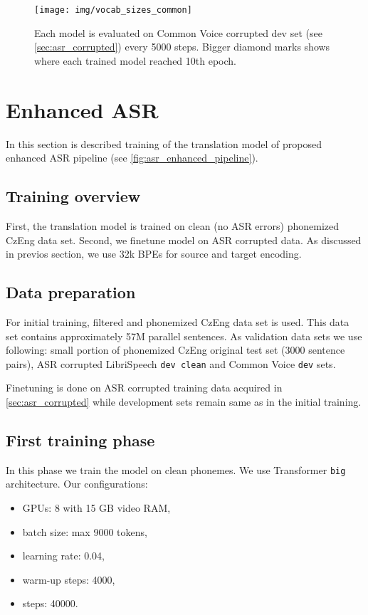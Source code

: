 \begin{figure}[h]
	\texttt{[image: img/vocab\_sizes\_common]}
	\caption{Each model is evaluated on Common Voice corrupted dev set (see \cref{sec:asr_corrupted}) every 5000 steps. Bigger diamond marks shows where each trained model reached 10th epoch.}
	\label{fig:vocab_sizes_common}
\end{figure}

\section{Enhanced ASR}
In this section is described training of the translation model of proposed enhanced ASR pipeline (see \cref{fig:asr_enhanced_pipeline}).

\subsection{Training overview}
First, the translation model is trained on clean (no ASR errors) phonemized CzEng data set. Second, we finetune model on ASR corrupted data. As discussed in previos section, we use 32k BPEs for source and target encoding.

\subsection{Data preparation}
For initial training, filtered and phonemized CzEng data set is used. This data set contains approximately 57M parallel sentences. As validation data sets we use following: small portion of phonemized CzEng original test set (3000 sentence pairs), ASR corrupted LibriSpeech \texttt{dev clean} and Common Voice \texttt{dev} sets.

Finetuning is done on ASR corrupted training data acquired in \cref{sec:asr_corrupted} while development sets remain same as in the initial training.

\subsection{First training phase}
In this phase we train the model on clean phonemes. We use Transformer \texttt{big} architecture.
Our configurations:

\begin{itemize}
    \item GPUs: 8 with 15 GB video RAM,
    \item batch size: max 9000 tokens,
    \item learning rate: 0.04,
    \item warm-up steps: 4000,
    \item steps: 40000.
\end{itemize}

